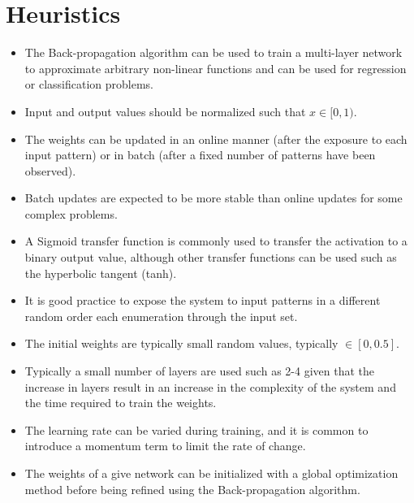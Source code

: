 \documentclass[a4paper, 11pt]{article}
\begin{document}
\section{Heuristics}
\label{sec:heuristics}
\begin{itemize}
	\item The Back-propagation algorithm can be used to train a multi-layer network to approximate arbitrary non-linear functions and can be used for regression or classification problems.
	\item Input and output values should be normalized such that $x \in [0,1)$.
	\item The weights can be updated in an online manner (after the exposure to each input pattern) or in batch (after a fixed number of patterns have been observed).
	\item Batch updates are expected to be more stable than online updates for some complex problems.
	\item A Sigmoid transfer function is commonly used to transfer the activation to a binary output value, although other transfer functions can be used such as the hyperbolic tangent (tanh).
	\item It is good practice to expose the system to input patterns in a different random order each enumeration through the input set.
	\item The initial weights are typically small random values, typically $\in [0, 0.5]$.
	\item Typically a small number of layers are used such as 2-4 given that the increase in layers result in an increase in the complexity of the system and the time required to train the weights.
	\item The learning rate can be varied during training, and it is common to introduce a momentum term to limit the rate of change.
	\item The weights of a give network can be initialized with a global optimization method before being refined using the Back-propagation algorithm.
\end{itemize}

\end{document}
